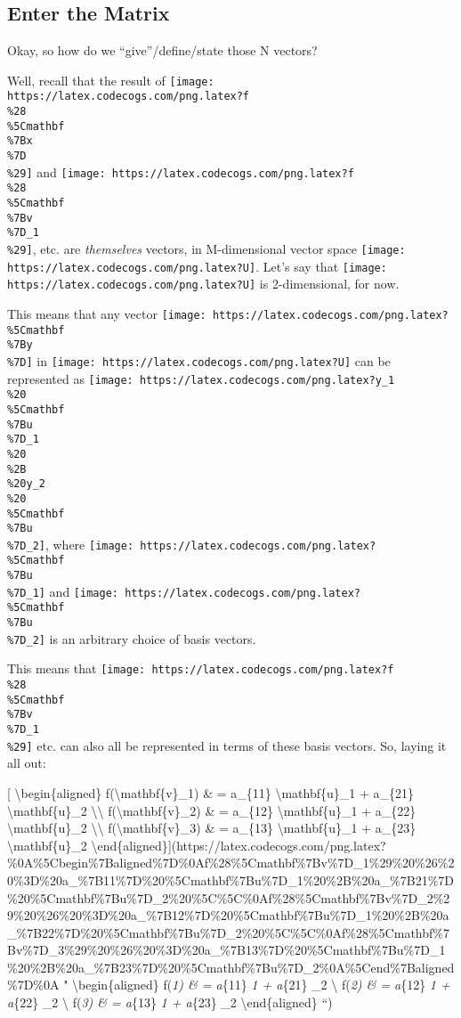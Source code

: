 \documentclass[]{article}
\begin{document}
\hypertarget{enter-the-matrix}{%
\subsection{Enter the Matrix}\label{enter-the-matrix}}

Okay, so how do we ``give''/define/state those N vectors?

Well, recall that the result of
\texttt{[image: https://latex.codecogs.com/png.latex?f\\\%28\\\%5Cmathbf\\\%7Bx\\\%7D\\\%29]}
and
\texttt{[image: https://latex.codecogs.com/png.latex?f\\\%28\\\%5Cmathbf\\\%7Bv\\\%7D\_1\\\%29]},
etc. are \emph{themselves} vectors, in M-dimensional vector space
\texttt{[image: https://latex.codecogs.com/png.latex?U]}. Let's say that
\texttt{[image: https://latex.codecogs.com/png.latex?U]} is 2-dimensional, for
now.

This means that any vector
\texttt{[image: https://latex.codecogs.com/png.latex?\\\%5Cmathbf\\\%7By\\\%7D]} in
\texttt{[image: https://latex.codecogs.com/png.latex?U]} can be represented as
\texttt{[image: https://latex.codecogs.com/png.latex?y\_1\\\%20\\\%5Cmathbf\\\%7Bu\\\%7D\_1\\\%20\\\%2B\\\%20y\_2\\\%20\\\%5Cmathbf\\\%7Bu\\\%7D\_2]},
where
\texttt{[image: https://latex.codecogs.com/png.latex?\\\%5Cmathbf\\\%7Bu\\\%7D\_1]} and
\texttt{[image: https://latex.codecogs.com/png.latex?\\\%5Cmathbf\\\%7Bu\\\%7D\_2]} is
an arbitrary choice of basis vectors.

This means that
\texttt{[image: https://latex.codecogs.com/png.latex?f\\\%28\\\%5Cmathbf\\\%7Bv\\\%7D\_1\\\%29]}
etc. can also all be represented in terms of these basis vectors. So, laying it
all out:

{[} \textbackslash{}begin\{aligned\} f(\textbackslash{}mathbf\{v\}\_1) \& =
a\_\{11\} \textbackslash{}mathbf\{u\}\_1 + a\_\{21\}
\textbackslash{}mathbf\{u\}\_2 \textbackslash{}\textbackslash{}
f(\textbackslash{}mathbf\{v\}\_2) \& = a\_\{12\} \textbackslash{}mathbf\{u\}\_1
+ a\_\{22\} \textbackslash{}mathbf\{u\}\_2 \textbackslash{}\textbackslash{}
f(\textbackslash{}mathbf\{v\}\_3) \& = a\_\{13\} \textbackslash{}mathbf\{u\}\_1
+ a\_\{23\} \textbackslash{}mathbf\{u\}\_2
\textbackslash{}end\{aligned\}{]}(https://latex.codecogs.com/png.latex?\%0A\%5Cbegin\%7Baligned\%7D\%0Af\%28\%5Cmathbf\%7Bv\%7D\_1\%29\%20\%26\%20\%3D\%20a\_\%7B11\%7D\%20\%5Cmathbf\%7Bu\%7D\_1\%20\%2B\%20a\_\%7B21\%7D\%20\%5Cmathbf\%7Bu\%7D\_2\%20\%5C\%5C\%0Af\%28\%5Cmathbf\%7Bv\%7D\_2\%29\%20\%26\%20\%3D\%20a\_\%7B12\%7D\%20\%5Cmathbf\%7Bu\%7D\_1\%20\%2B\%20a\_\%7B22\%7D\%20\%5Cmathbf\%7Bu\%7D\_2\%20\%5C\%5C\%0Af\%28\%5Cmathbf\%7Bv\%7D\_3\%29\%20\%26\%20\%3D\%20a\_\%7B13\%7D\%20\%5Cmathbf\%7Bu\%7D\_1\%20\%2B\%20a\_\%7B23\%7D\%20\%5Cmathbf\%7Bu\%7D\_2\%0A\%5Cend\%7Baligned\%7D\%0A
" \textbackslash{}begin\{aligned\} f(\emph{1) \& = a}\{11\}
\emph{1 + a}\{21\} \_2 \textbackslash{} f(\emph{2)
\& = a}\{12\} \emph{1 + a}\{22\} \_2 \textbackslash{}
f(\emph{3) \& = a}\{13\} \emph{1 + a}\{23\} \_2
\textbackslash{}end\{aligned\} ``)
\end{document}
